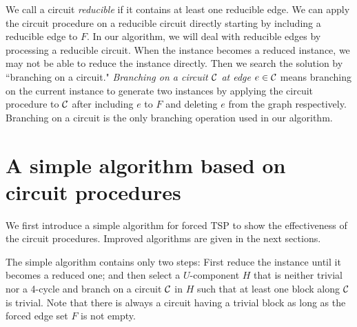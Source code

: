 \documentclass[runningheads]{llncs}
\begin{document}
\bigskip


We call a circuit \emph{reducible} if it contains at least one reducible edge.
We can apply the circuit procedure on a reducible circuit directly starting by including a reducible edge to $F$.
In our algorithm, we will deal with reducible edges
by processing a reducible circuit.
When the instance becomes a reduced instance, we may not be able to reduce the instance directly.
Then we search the solution by ``branching on a circuit."
\emph{Branching on a circuit ${\cal C}$ at edge $e\in {\cal C}$} means branching on the current instance to generate
 two instances by applying the circuit procedure to ${\cal C}$ after including $e$ to $F$ and deleting $e$ from the graph respectively.
Branching on a circuit is the only branching operation used in our algorithm.










\section{A simple algorithm based on circuit procedures}\label{simple_alg}
We first introduce a simple algorithm for forced TSP to show the effectiveness of the circuit procedures. Improved algorithms are given in the next sections.

The simple algorithm contains only two steps: First reduce the instance until it becomes a reduced one;
and then select a $U$-component $H$ that is neither trivial nor a 4-cycle and branch on a circuit ${\cal C}$ in $H$ such that at least one block along ${\cal C}$ is trivial.
Note that there is always a circuit having a trivial block as long as the forced edge set $F$ is not empty.
\end{document}
